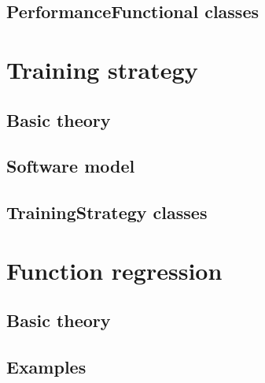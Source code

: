 \documentclass[pdftex, a4paper, 10pt]{book}
\begin{document}
\section{PerformanceFunctional classes}\label{PerformanceFunctionalClasses}


 
\chapter{Training strategy}\label{TrainingStrategy}


\section{Basic theory}\label{TrainingStrategyBasicTheory}


\section{Software model}\label{TrainingStrategySoftwareModel}


\section{TrainingStrategy classes}\label{TrainingStrategyClasses}



\chapter{Function regression}\label{FunctionRegression}


\section{Basic theory}\label{BasicTheoryFunctionRegression}

 
\section{Examples}\label{ExamplesFunctionRegression}

\end{document}
